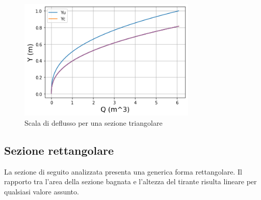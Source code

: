 \documentclass[12pt]{article} %
\begin{document}
\begin{figure}[H]
    \centering
    \includegraphics[width=8.5cm]{deflussotri.png}
    \caption{Scala di deflusso per una sezione triangolare}
    \label{fig:triangolare_scala_deflusso}
\end{figure}

\subsection{Sezione rettangolare}

\noindent La sezione di seguito analizzata presenta una generica forma rettangolare.
Il rapporto tra l’area della sezione bagnata e l’altezza del tirante risulta lineare per qualsiasi valore assunto.
\end{document}
